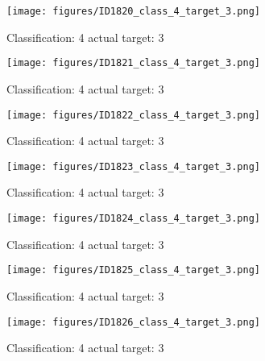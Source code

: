 \begin{figure}[h!]
\begin{center}
\texttt{[image: figures/ID1820\_class\_4\_target\_3.png]}
\end{center}
\caption{ Classification: 4 actual target: 3}
\label{fig:ID1820_class_4_target_3}
\end{figure}
\begin{figure}[h!]
\begin{center}
\texttt{[image: figures/ID1821\_class\_4\_target\_3.png]}
\end{center}
\caption{ Classification: 4 actual target: 3}
\label{fig:ID1821_class_4_target_3}
\end{figure}
\begin{figure}[h!]
\begin{center}
\texttt{[image: figures/ID1822\_class\_4\_target\_3.png]}
\end{center}
\caption{ Classification: 4 actual target: 3}
\label{fig:ID1822_class_4_target_3}
\end{figure}
\begin{figure}[h!]
\begin{center}
\texttt{[image: figures/ID1823\_class\_4\_target\_3.png]}
\end{center}
\caption{ Classification: 4 actual target: 3}
\label{fig:ID1823_class_4_target_3}
\end{figure}
\begin{figure}[h!]
\begin{center}
\texttt{[image: figures/ID1824\_class\_4\_target\_3.png]}
\end{center}
\caption{ Classification: 4 actual target: 3}
\label{fig:ID1824_class_4_target_3}
\end{figure}
\begin{figure}[h!]
\begin{center}
\texttt{[image: figures/ID1825\_class\_4\_target\_3.png]}
\end{center}
\caption{ Classification: 4 actual target: 3}
\label{fig:ID1825_class_4_target_3}
\end{figure}
\begin{figure}[h!]
\begin{center}
\texttt{[image: figures/ID1826\_class\_4\_target\_3.png]}
\end{center}
\caption{ Classification: 4 actual target: 3}
\label{fig:ID1826_class_4_target_3}
\end{figure}
